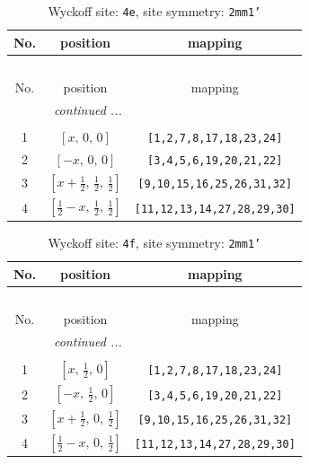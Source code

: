 \documentclass[fleqn,8pt]{jsarticle}
\begin{document}
\begin{longtable}{ccc}
\caption{Wyckoff site: {\tt 4e}, site symmetry: {\tt 2mm1'}}
 \\
 \hline \hline
No. & position & mapping \\ \hline \endfirsthead

\multicolumn{2}{l}{\tablename\ \thetable{}} \\
 \hline \hline
No. & position & mapping \\ \hline \endhead

 \hline \hline
\multicolumn{2}{r}{\footnotesize\it continued ...} \\ \endfoot

 \hline \hline
\multicolumn{2}{r}{} \\ \endlastfoot

1 & $\left[ x,\, 0,\, 0 \right]$ & {\tt [1,2,7,8,17,18,23,24]} \\ \hline
2 & $\left[ - x,\, 0,\, 0 \right]$ & {\tt [3,4,5,6,19,20,21,22]} \\ \hline
3 & $\left[ x + \frac{1}{2},\, \frac{1}{2},\, \frac{1}{2} \right]$ & {\tt [9,10,15,16,25,26,31,32]} \\ \hline
4 & $\left[ \frac{1}{2} - x,\, \frac{1}{2},\, \frac{1}{2} \right]$ & {\tt [11,12,13,14,27,28,29,30]} \\
\end{longtable}
\renewcommand{\arraystretch}{1.2}
\begin{longtable}{ccc}
\caption{Wyckoff site: {\tt 4f}, site symmetry: {\tt 2mm1'}}
 \\
 \hline \hline
No. & position & mapping \\ \hline \endfirsthead

\multicolumn{2}{l}{\tablename\ \thetable{}} \\
 \hline \hline
No. & position & mapping \\ \hline \endhead

 \hline \hline
\multicolumn{2}{r}{\footnotesize\it continued ...} \\ \endfoot

 \hline \hline
\multicolumn{2}{r}{} \\ \endlastfoot

1 & $\left[ x,\, \frac{1}{2},\, 0 \right]$ & {\tt [1,2,7,8,17,18,23,24]} \\ \hline
2 & $\left[ - x,\, \frac{1}{2},\, 0 \right]$ & {\tt [3,4,5,6,19,20,21,22]} \\ \hline
3 & $\left[ x + \frac{1}{2},\, 0,\, \frac{1}{2} \right]$ & {\tt [9,10,15,16,25,26,31,32]} \\ \hline
4 & $\left[ \frac{1}{2} - x,\, 0,\, \frac{1}{2} \right]$ & {\tt [11,12,13,14,27,28,29,30]} \\
\end{longtable}
\end{document}
